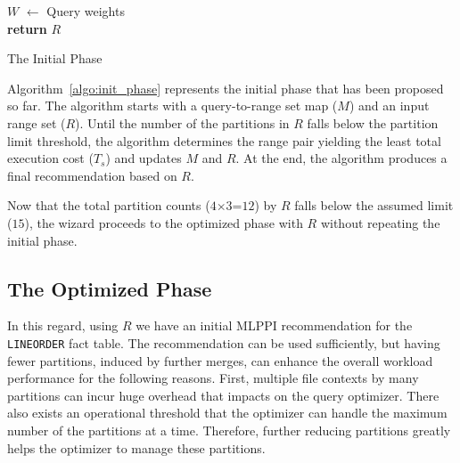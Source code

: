 \documentclass[paper]{ieice}
\begin{document}
\begin{algorithm}[t]
{
	$W$ $\leftarrow$ Query weights \\
	{\bf return} $R$\;
}
\caption{The Initial Phase}
\label{algo:init_phase}
\end{algorithm}


Algorithm~\ref{algo:init_phase} represents the initial phase 
that has been proposed so far. 
The algorithm starts with a query-to-range set map ($M$) and an input range set ($R$). 
Until the number of the partitions in $R$ falls below the partition limit threshold, 
the algorithm determines the range pair yielding the least total execution cost ($T_{s}$) 
and updates $M$ and $R$. At the end, the algorithm produces a final recommendation based on $R$.

Now that the total partition counts ($4${$\times$}$3$=$12$) by $R$ falls  
below the assumed limit ($15$), the wizard 
proceeds to the optimized phase with $R$ without repeating the initial phase. 

\subsection{The Optimized Phase}
\label{sec:opt_phase}

In this regard, using $R$ we have an initial MLPPI recommendation for the {\tt LINEORDER} fact table.
The recommendation can be used sufficiently, but 
having fewer partitions, induced by further merges, 
can enhance the overall workload performance for the following reasons. 
First, multiple file contexts by many partitions can incur 
huge overhead that impacts on the query optimizer. 
There also exists an operational threshold 
that the optimizer can handle the maximum number of the partitions at a time.
Therefore, further reducing partitions greatly helps the optimizer to manage these partitions.
\end{document}
